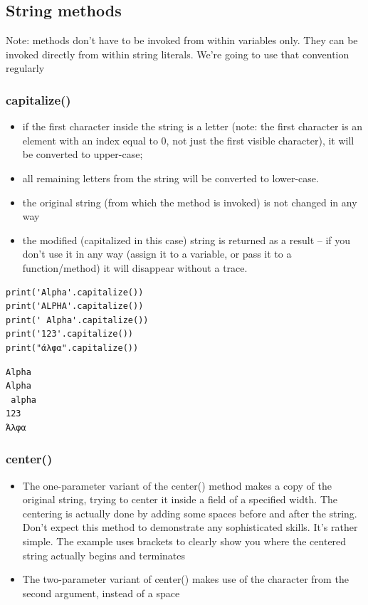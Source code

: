 \documentclass[11pt]{article}
\begin{document}
\newpage
\subsection{String methods}
\label{sec:org864555a}
Note: methods don’t have to be invoked from within variables
only. They can be invoked directly from within string literals. We’re
going to use that convention regularly

\subsubsection{capitalize()}
\label{sec:orgc13bd42}
\begin{itemize}
\item if the first character inside the string is a letter (note: the
first character is an element with an index equal to 0, not just the
first visible character), it will be converted to upper-case;
\item all remaining letters from the string will be converted to
lower-case.
\item the original string (from which the method is invoked) is not
changed in any way
\item the modified (capitalized in this case) string is returned as a
result – if you don’t use it in any way (assign it to a variable, or
pass it to a function/method) it will disappear without a trace.
\end{itemize}

\begin{verbatim}
print('Alpha'.capitalize())
print('ALPHA'.capitalize())
print(' Alpha'.capitalize())
print('123'.capitalize())
print("άλφα".capitalize())
\end{verbatim}

\begin{verbatim}
Alpha
Alpha
 alpha
123
Άλφα
\end{verbatim}

\subsubsection{center()}
\label{sec:orgbcc48e5}
\begin{itemize}
\item The one-parameter variant of the center() method makes a copy of the
original string, trying to center it inside a field of a specified
width. The centering is actually done by adding some spaces before
and after the string. Don’t expect this method to demonstrate any
sophisticated skills. It’s rather simple. The example uses brackets
to clearly show you where the centered string actually begins and
terminates
\item The two-parameter variant of center() makes use of the character
from the second argument, instead of a space
\end{itemize}
\end{document}
